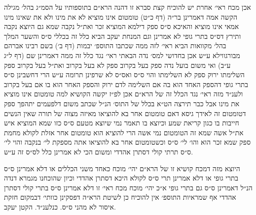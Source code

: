 \documentclass[12pt, openany]{book}
\begin{document}
\begin{multicols}{2}
אכן מכח ראי׳ אחרת יש להוכיח קצת סברא זו דהנה הרא״ם בתוספותיו על הסמ״ג בהל׳ מגילה הקשה אמה דאמרינן בר״ה (דף כ״ט) טומטום אינו מוציא לא את מינו ולא את שאינו מינו אמאי אינו מוציא והאיכא ס״ס ספק דילמא המוציא זכר ואת״ל נקבה שמא גם היוצא נקבה ותירץ דס״ס בתרי גופי לא אמרינן וגם המנחת יעקב הביא כלל זה בכללי ס״ס והשער המלך בהל׳ מקוואות הביא ראי׳ לזה ממה שכתבו התוספ׳ יבמות (דף ב׳) בשם רבינו אברהם מבורגווילא ע״ש אכן בחדושי למס׳ נדה הבאתי ראי׳ נגד כלל זה ממה דאמרינן שם (דף ל״ג ע״ב) ואי משום בועל נדה ספק בעל בקרוב ספק לא בעל בקרוב ואת״ל בעל בקרוב ספק השלימתו ירוק ספק לא השלימתו והוי ס״ס ואס״ס לא שרפינן תרומה ע״ש הרי דחשבינן ס״ס בתרי גופי דהספק האחד הוא בה אם השלימה לדם ירוק והספק האחר הוא בו אם בעל בקרוב ולענ״ד מזה ראי׳ נגד הכלל זה של הרא״ם אכן לפ״ז יקשה הקושיא למה טומטום אינו מוציא את מינו אבל כבר תירצה הט״א בכלל של התוס׳ הנ״ל שכתב משום דלפעמים יתהפך ספק דטומטום זה לאידך גיסא דאם טומטום אחר בא להוציאו מאיזה מצוה של תורה שאין הנשים חייבות בו כגון קריאת שמע וכיוצא בו תאמר נמי שיוצא מטעם ס״ס כזו שמא המוציא איש את״ל אשה שמא זה הטומטום נמי אשה הרי להוציא הוא טומטום אחר אזלת לקולא מחמת ספק שמא זכר הוא והו׳ לי׳ ס״ס וכשטומטום אחר בא להוציאו אתה מספקת לי׳ בנקבה והוי לי׳ ס״ס תרתי קולי דסתרן אהדדי ומשום הכי לא אמרינן כלל לס״ס זה ע״ש.\\\vspace{0pt}

היוצא מזה דמכח קושיא זו של הרא״ם יהי׳ מוכח כאחד משני הכללים או דלא אמרינן ס״ס בתרי גופי או דלא אמרינן תרי ס״ס לקולא היכא דסתרן אהדדי וכיון שהוכחנו מגמרא דנדה הנ״ל דאמרינן ס״ס גם בתרי גופי א״כ יהי׳ מוכח מכח ראי׳ זו דלא אמרינן ס״ס בתרי קולי דסתרן אהדדי אף שמראיות התוספ׳ אין להוכיח כן לשיטת הרא״ה דפסקינן כוותי׳ דבמקום חזקת איסור לא מהני ס״ס. כנלענ״ד. הקטן יעקב.\\\vspace{0pt}

\end{multicols}\newpage
\end{document}
